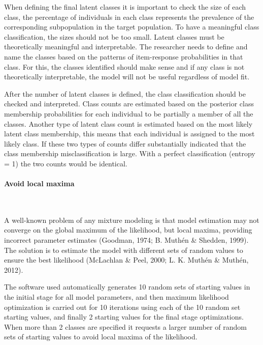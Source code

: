 \documentclass[12pt,a4paper,oneside]{reedthesis}
\begin{document}
When defining the final latent classes it is important to check the size of each class, the percentage of individuals in each class represents the prevalence of the corresponding subpopulation in the target population. To have a meaningful class classification, the sizes should not be too small.
Latent classes must be theoretically meaningful and interpretable. The researcher needs to define and name the classes based on the patterns of item-response probabilities in that class. For this, the classes identified should make sense and if any class is not theoretically interpretable, the model will not be useful regardless of model fit.

After the number of latent classes is defined, the class classification should be checked and interpreted. Class counts are estimated based on the posterior class membership probabilities for each individual to be partially a member of all the classes. Another type of latent class count is estimated based on the most likely latent class membership, this means that each individual is assigned to the most likely class. If these two types of counts differ substantially indicated that the class membership misclassification is large. With a perfect classification (entropy = 1) the two counts would be identical.

\hypertarget{avoid-local-maxima}{%
\paragraph{Avoid local maxima}\label{avoid-local-maxima}}

~

A well-known problem of any mixture modeling is that model estimation may not converge on the global maximum of the likelihood, but local maxima, providing incorrect parameter estimates (Goodman, 1974; B. Muthén \& Shedden, 1999). The solution is to estimate the model with different sets of random values to ensure the best likelihood (McLachlan \& Peel, 2000; L. K. Muthén \& Muthén, 2012).

The software used automatically generates 10 random sets of starting values in the initial stage for all model parameters, and then maximum likelihood optimization is carried out for 10 iterations using each of the 10 random set starting values, and finally 2 starting values for the final stage optimizations. When more than 2 classes are specified it requests a larger number of random sets of starting values to avoid local maxima of the likelihood.
\end{document}

